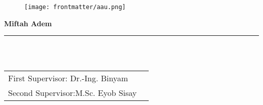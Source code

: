 \begin{titlepage}

  \setcounter{page}{-1}

 \begin{figure}[h]
		\begin{center}	
  \centering
			\texttt{[image: frontmatter/aau.png]}
		\hspace{4cm}
			\end{center}
	\end{figure}

	\vfill
	
	\begin{center}
		\vspace{14mm}
        {\makeatletter
		\noindent \textbf{\huge\@title}
        \makeatother}
		\vspace{60mm}	
	\end{center}
	
	\vfill
	
	\noindent \textbf{Miftah Adem} \\
	\noindent \rule{\textwidth}{0.4mm} 
 
	 \\
     \\
    

\noindent\begin{tabular}{@{}ll}
First Supervisor: Dr.-Ing. Binyam\\
Second Supervisor:M.Sc. Eyob Sisay\\
\end{tabular}




\end{titlepage}
